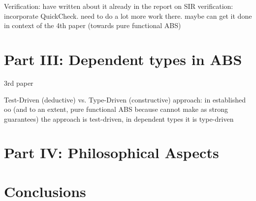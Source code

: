 \documentclass[oneside]{book}
\begin{document}
Verification:
have written about it already in the report on SIR verification: incorporate QuickCheck. need to do a lot more work there. maybe can get it done in context of the 4th paper (towards pure functional ABS)

\chapter{Part III: Dependent types in ABS}
3rd paper

Test-Driven (deductive) vs. Type-Driven (constructive) approach: in established oo (and to an extent, pure functional ABS because cannot make as strong guarantees) the approach is test-driven, in dependent types it is type-driven

\chapter{Part IV: Philosophical Aspects}

\chapter{Conclusions}



\end{document}

